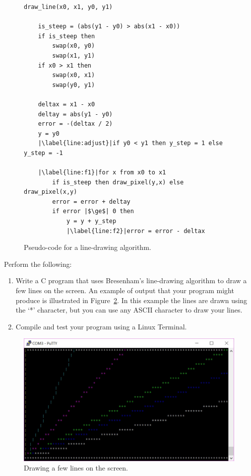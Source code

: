 \documentclass[epsfig,10pt,fullpage]{article}
\begin{document}
\begin{figure}[h]
\begin{center}
\begin{minipage}[t]{12.5 cm}
\begin{lstlisting}[name=bresenham]
draw_line(x0, x1, y0, y1)

    is_steep = (abs(y1 - y0) > abs(x1 - x0))
    if is_steep then
        swap(x0, y0)
        swap(x1, y1)
    if x0 > x1 then
        swap(x0, x1)
        swap(y0, y1)

    deltax = x1 - x0
    deltay = abs(y1 - y0)
    error = -(deltax / 2)
    y = y0
    |\label{line:adjust}|if y0 < y1 then y_step = 1 else y_step = -1

    |\label{line:f1}|for x from x0 to x1
        if is_steep then draw_pixel(y,x) else draw_pixel(x,y)
        error = error + deltay
        if error |$\ge$| 0 then
            y = y + y_step
            |\label{line:f2}|error = error - deltax
\end{lstlisting}
\end{minipage}
\caption{Pseudo-code for a line-drawing algorithm.}
\label{fig:bresenham}
\end{center}
\end{figure}

\noindent
Perform the following:

\begin{enumerate}

\item Write a C program that uses Bresenham's line-drawing algorithm to draw a few lines on 
the screen.  An example of output that your program might produce is illustrated in 
Figure~\ref{fig:lines}. In this example the lines are drawn using the `*' character, but
you can use any ASCII character to draw your lines.

\item Compile and test your program using a Linux Terminal.

\end{enumerate}

\begin{figure}[h]
   \begin{center}
       \includegraphics[width=12cm]{figures/lines}
   \end{center}
   \caption{Drawing a few lines on the screen.}
    \label{fig:lines}
\end{figure}
\end{document}
